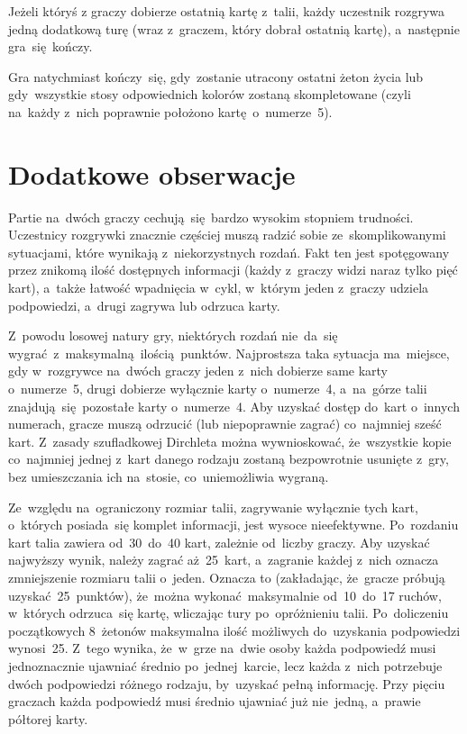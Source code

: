 \documentclass[declaration,shortabstract,inz]{iithesis}
\begin{document}
Jeżeli któryś z graczy dobierze ostatnią kartę z~talii, każdy uczestnik rozgrywa jedną dodatkową turę (wraz z~graczem, który dobrał ostatnią kartę), a~następnie gra~się kończy.

Gra natychmiast kończy~się, gdy~zostanie utracony ostatni żeton życia lub gdy~wszystkie stosy odpowiednich kolorów zostaną skompletowane (czyli na~każdy z~nich poprawnie położono kartę o~numerze~5).

\section{Dodatkowe obserwacje}

Partie na~dwóch graczy cechują~się bardzo wysokim stopniem trudności. Uczestnicy rozgrywki znacznie częściej muszą radzić sobie ze~skomplikowanymi sytuacjami, które wynikają z~niekorzystnych rozdań. Fakt ten jest spotęgowany przez znikomą ilość dostępnych informacji (każdy z~graczy widzi naraz tylko pięć kart), a~także łatwość wpadnięcia w~cykl, w~którym jeden z~graczy udziela podpowiedzi, a~drugi zagrywa lub odrzuca karty.

Z~powodu losowej natury gry, niektórych rozdań nie~da~się wygrać z~maksymalną ilością punktów. Najprostsza taka sytuacja ma~miejsce, gdy w~rozgrywce na~dwóch graczy jeden z~nich dobierze same karty o~numerze~5, drugi dobierze wyłącznie karty o~numerze~4, a~na~górze talii znajdują~się pozostałe karty o~numerze~4. Aby uzyskać dostęp do~kart o~innych numerach, gracze muszą odrzucić (lub niepoprawnie zagrać) co~najmniej sześć kart. Z~zasady szufladkowej Dirchleta można wywnioskować, że~wszystkie kopie co~najmniej jednej z~kart danego rodzaju zostaną bezpowrotnie usunięte z~gry, bez umieszczania ich na~stosie, co~uniemożliwia wygraną.

Ze~względu na~ograniczony rozmiar talii, zagrywanie wyłącznie tych kart, o~których posiada~się komplet informacji, jest wysoce nieefektywne. Po~rozdaniu kart talia zawiera od~30~do~40 kart, zależnie od~liczby graczy. Aby uzyskać najwyższy wynik, należy zagrać aż~25~kart, a~zagranie każdej z~nich oznacza zmniejszenie rozmiaru talii o~jeden. Oznacza to (zakładając, że~gracze próbują uzyskać 25~punktów), że~można wykonać maksymalnie od~10~do~17 ruchów, w~których odrzuca~się kartę, wliczając tury po~opróżnieniu talii. Po~doliczeniu początkowych 8~żetonów maksymalna ilość możliwych do~uzyskania podpowiedzi wynosi~25. Z~tego wynika, że~w~grze na~dwie osoby każda podpowiedź musi jednoznacznie ujawniać średnio po~jednej karcie, lecz każda z~nich potrzebuje dwóch podpowiedzi różnego rodzaju, by~uzyskać pełną informację. Przy pięciu graczach każda podpowiedź musi średnio ujawniać już nie~jedną, a~prawie półtorej karty.
\end{document}
